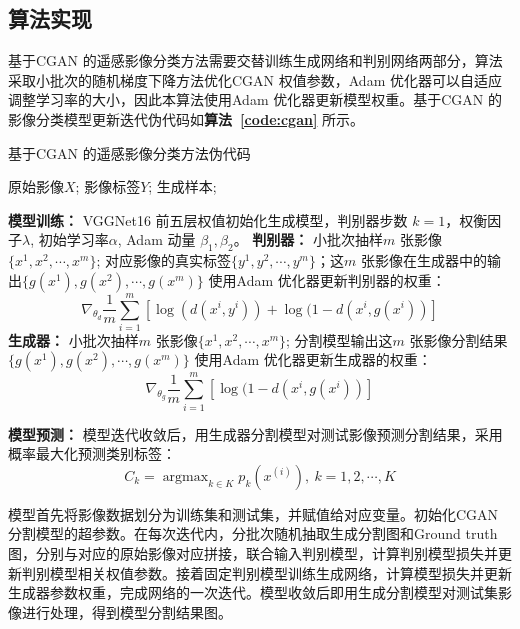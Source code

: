\subsection{算法实现}
\label{subsec:firtst-2}

基于CGAN 的遥感影像分类方法需要交替训练生成网络和判别网络两部分，算法采取小批次的随机梯度下降方法优化CGAN 权值参数，Adam \cite{kingma2014adam} 优化器可以自适应调整学习率的大小，因此本算法使用Adam 优化器更新模型权重。基于CGAN 的影像分类模型更新迭代伪代码如\textbf{算法~\ref{code:cgan}} 所示。

\begin{algorithm}[!h]
  \caption{基于CGAN 的遥感影像分类方法伪代码}
  \begin{algorithmic}[1]
    \Require
    原始影像$X$; 影像标签$Y$;
    \Ensure
    生成样本;

    \textbf{模型训练：}
    \State VGGNet16 前五层权值初始化生成模型，判别器步数 $k= 1$，权衡因子$\lambda$, 初始学习率$\alpha$, Adam 动量 $\beta_1,\beta_2$。
    \State \textbf{判别器：}
    \State 小批次抽样$m$ 张影像$\{x^1,x^2,\cdots, x^m\}$; 对应影像的真实标签$\{y^1,y^2,\cdots, y^m\}$；这$m$ 张影像在生成器中的输出$\{g(x^1),g(x^2),\cdots, g(x^m) \}$
    \State 使用Adam 优化器更新判别器的权重：
    $$
      \nabla_{\theta_d} \frac{1}{m} \sum_{i=1} ^m [\log(d(x^i,y^i)) + \log(1-d(x^i,g(x^i)) ]
    $$
    \EndFor
    \State \textbf{生成器：}
    \State 小批次抽样$m$ 张影像$\{x^1,x^2,\cdots, x^m\}$;
    \State 分割模型输出这$m$ 张影像分割结果$\{g(x^1),g(x^2),\cdots, g(x^m) \}$
    \State 使用Adam 优化器更新生成器的权重：
    $$
      \nabla_{\theta_g} \frac{1}{m} \sum_{i=1} ^m [\log(1-d(x^i,g(x^i))]
    $$
    \EndFor

    \textbf{模型预测：}
    \State 模型迭代收敛后，用生成器分割模型对测试影像预测分割结果，采用概率最大化预测类别标签：
    $$
      C_k = \mathop{\arg\max}_{k \in K} p_k(x^{(i)}), \ k=1,2,\cdots,K
    $$

  \end{algorithmic}
  \label{code:cgan}
\end{algorithm}


模型首先将影像数据划分为训练集和测试集，并赋值给对应变量。初始化CGAN 分割模型的超参数。在每次迭代内，分批次随机抽取生成分割图和Ground truth 图，分别与对应的原始影像对应拼接，联合输入判别模型，计算判别模型损失并更新判别模型相关权值参数。接着固定判别模型训练生成网络，计算模型损失并更新生成器参数权重，完成网络的一次迭代。模型收敛后即用生成分割模型对测试集影像进行处理，得到模型分割结果图。


